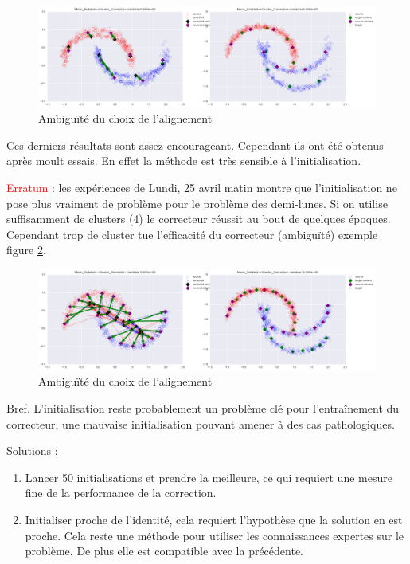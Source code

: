 \begin{figure}[H] %
\centering
\includegraphics[width=\linewidth]{fig/21-04-2016/Stuck_2.png}
\caption{Ambiguïté du choix de l'alignement}
\label{fig:stuck_2}
\end{figure}



Ces derniers résultats sont assez encourageant. Cependant ils ont été obtenus
après moult essais. En effet la méthode est très sensible à l'initialisation.

\textcolor{red}{Erratum} : les expériences de Lundi, 25 avril matin montre que 
l'initialisation ne pose plus vraiment de problème pour le problème des 
demi-lunes. Si on utilise suffisamment de clusters (4) le correcteur réussit 
au bout de quelques époques.
Cependant trop de cluster tue l'efficacité du correcteur (ambiguïté) exemple
figure \ref{fig:stuck_trop}.

\begin{figure}[H] %
\centering
\includegraphics[width=\linewidth]{fig/21-04-2016/Stuck_trop.png}
\caption{Ambiguïté du choix de l'alignement}
\label{fig:stuck_trop}
\end{figure}

Bref. L'initialisation reste probablement un problème clé pour l'entraînement 
du correcteur, une mauvaise initialisation pouvant amener à des cas 
pathologiques.

Solutions : 
\begin{enumerate}
	\item Lancer 50 initialisations et prendre la meilleure, ce qui requiert
une mesure fine de la performance de la correction.
	\item Initialiser proche de l'identité, cela requiert l'hypothèse que 
la solution en est proche. Cela reste une méthode pour utiliser les 
connaissances expertes sur le problème. De plus elle est compatible avec
la précédente.
\end{enumerate}

